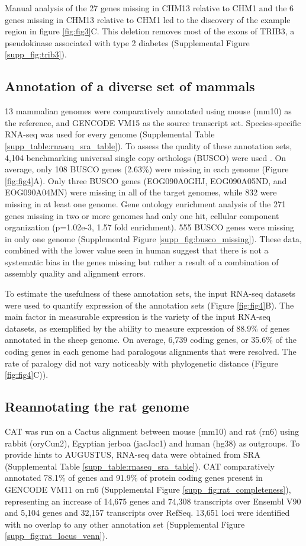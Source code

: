 \documentclass[fleqn,10pt]{wlscirep}
\begin{document}
Manual analysis of the 27 genes missing in CHM13 relative to CHM1 and the 6 genes missing in CHM13 relative to CHM1 led to the discovery of the example region in figure \ref{fig:fig3}C. This deletion removes most of the exons of TRIB3, a pseudokinase associated with type 2 diabetes \cite{shi2009association} (Supplemental Figure \ref{supp_fig:trib3}).


\subsection*{Annotation of a diverse set of mammals}
	13 mammalian genomes were comparatively annotated using mouse (mm10) as the reference, and GENCODE VM15 as the source transcript set. Species-specific RNA-seq was used for every genome (Supplemental Table \ref{supp_table:rnaseq_sra_table}). To assess the quality of these annotation sets, 4,104 benchmarking universal single copy orthologs (BUSCO) were used \cite{simao2015busco}. On average, only 108 BUSCO genes (2.63\%) were missing in each genome  (Figure \ref{fig:fig4}A). Only three BUSCO genes (EOG090A0GHJ, EOG090A05ND, and EOG090A04MN) were missing in all of the target genomes, while 832 were missing in at least one genome. Gene ontology enrichment analysis of the 271 genes missing in two or more genomes had only one hit, cellular component organization (p=1.02e-3, 1.57 fold enrichment). 555 BUSCO genes were missing in only one genome (Supplemental Figure \ref{supp_fig:busco_missing}). These data, combined with the lower value seen in human suggest that there is not a systematic bias in the genes missing but rather a result of a combination of assembly quality and alignment errors.

To estimate the usefulness of these annotation sets, the input RNA-seq datasets were used to quantify expression of the annotation sets (Figure \ref{fig:fig4}B). The main factor in measurable expression is the variety of the input RNA-seq datasets, as exemplified by the ability to measure expression of 88.9\% of genes annotated in the sheep genome. On average, 6,739 coding genes, or 35.6\% of the coding genes in each genome had paralogous alignments that were resolved. The rate of paralogy did not vary noticeably with phylogenetic distance (Figure \ref{fig:fig4}C)).


\subsection*{Reannotating the rat genome}
	CAT was run on a Cactus alignment between mouse (mm10) and rat (rn6) using rabbit (oryCun2), Egyptian jerboa (jacJac1) and human (hg38) as outgroups. To provide hints to AUGUSTUS, RNA-seq data were obtained from SRA \cite{fushan2015gene,cortez2014origins,liu2016identification} (Supplemental Table \ref{supp_table:rnaseq_sra_table}). CAT comparatively annotated 78.1\% of genes and 91.9\% of protein coding genes present in GENCODE VM11 on rn6 (Supplemental Figure \ref{supp_fig:rat_completeness}), representing an increase of 14,675 genes and 74,308 transcripts over Ensembl V90 and 5,104 genes and 32,157 transcripts over RefSeq. 13,651 loci were identified with no overlap to any other annotation set (Supplemental Figure \ref{supp_fig:rat_locus_venn}).
    
\end{document}
